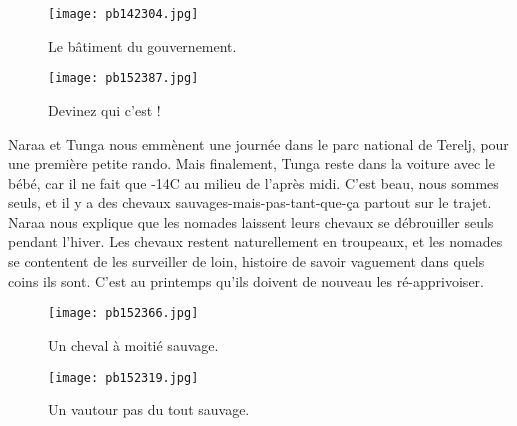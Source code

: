 \documentclass{book}
\begin{document}
\begin{figure}[h]
\centering
\texttt{[image: pb142304.jpg]}
\caption*{ Le bâtiment du gouvernement.}
\end{figure}


\begin{figure}[h]
\centering
\texttt{[image: pb152387.jpg]}
\caption*{ Devinez qui c'est !}
\end{figure}

Naraa et Tunga nous emmènent une journée dans le parc national de Terelj, pour une première petite rando. Mais finalement, Tunga reste dans la voiture avec le bébé, car il ne fait que -14\textdegree C au milieu de l'après midi. C'est beau, nous sommes seuls, et il y a des chevaux sauvages-mais-pas-tant-que-ça partout sur le trajet. Naraa nous explique que les nomades laissent leurs chevaux se débrouiller seuls pendant l'hiver. Les chevaux restent naturellement en troupeaux, et les nomades se contentent de les surveiller de loin, histoire de savoir vaguement dans quels coins ils sont. C'est au printemps qu'ils doivent de nouveau les ré-apprivoiser.


\begin{figure}[h]
\centering
\texttt{[image: pb152366.jpg]}
\caption*{ Un cheval à moitié sauvage.}
\end{figure}


\begin{figure}[h]
\centering
\texttt{[image: pb152319.jpg]}
\caption*{ Un vautour pas du tout sauvage.}
\end{figure}
\end{document}
